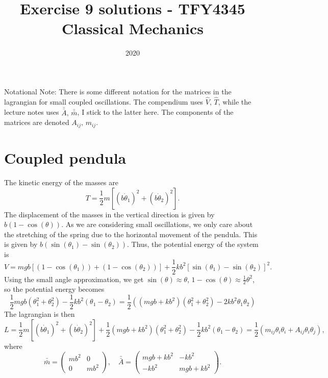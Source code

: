 \documentclass{article}
\title{Exercise 9 solutions - TFY4345 Classical Mechanics}
\date{2020}
\begin{document}
    \maketitle
    Notational Note: There is some different notation for the matrices in the lagrangian for small coupled oscillations. The compendium uses $\hat V, \, \hat T$, while the lecture notes uses $\bar {\bar A}, \, \bar {\bar m}$, I stick to the latter here. The components of the matrices are denoted $A_{ij}, \, m_{ij}$.
    \section{Coupled pendula}
        The kinetic energy of the masses are 
        \begin{equation*}
            T = \frac{1}{2}m\left[(b \dot \theta_1)^2 + (b \dot \theta_2)^2\right].
        \end{equation*}
        The displacement of the masses in the vertical direction is given by $b(1 - \cos(\theta))$. As we are considering small oscillations, we only care about the stretching of the spring due to the horizontal movement of the pendula. This is given by $b (\sin(\theta_1) - \sin(\theta_2))$. Thus, the potential energy of the system is
        \begin{equation*}
            V = mgb\left[(1 - \cos(\theta_1)) + (1 - \cos(\theta_2))\right] + \frac{1}{2}kb^2\left[\sin(\theta_1) - \sin(\theta_2)\right]^2.
        \end{equation*}
        Using the small angle approximation, we get $\sin(\theta) \approx \theta$, $1 - \cos(\theta) \approx \frac{1}{2} \theta^2$, so the potential energy becomes
        \begin{equation*}
            \frac{1}{2} mgb (\theta_1^2 + \theta_2^2) - \frac{1}{2}kb^2(\theta_1 - \theta_2) = \frac{1}{2}\left((mgb + kb^2)(\theta_1^2 + \theta_2^2) - 2kb^2 \theta_1 \theta_2\right)
        \end{equation*}
        The lagrangian is then
        \begin{equation*}
            L = \frac{1}{2}m\left[(b \dot \theta_1)^2 + (b \dot \theta_2)^2\right] + \frac{1}{2} (mgb + kb^2) (\theta_1^2 + \theta_2^2) - \frac{1}{2}kb^2(\theta_1 - \theta_2)  = \frac{1}{2}\left(m_{ij}\theta_i \theta_i + A_{ij}\theta_i \theta_j\right),
        \end{equation*}
        where
        \begin{equation*}
            \bar {\bar m} = 
            \begin{pmatrix*}
                mb^2 & 0 \\
                0 & mb^2
            \end{pmatrix*}
            , \quad \bar {\bar A} = 
            \begin{pmatrix}
                mgb + kb^2 & -kb^2 \\
                -kb^2 & mgb + kb^2
            \end{pmatrix}.
        \end{equation*}
\end{document}

